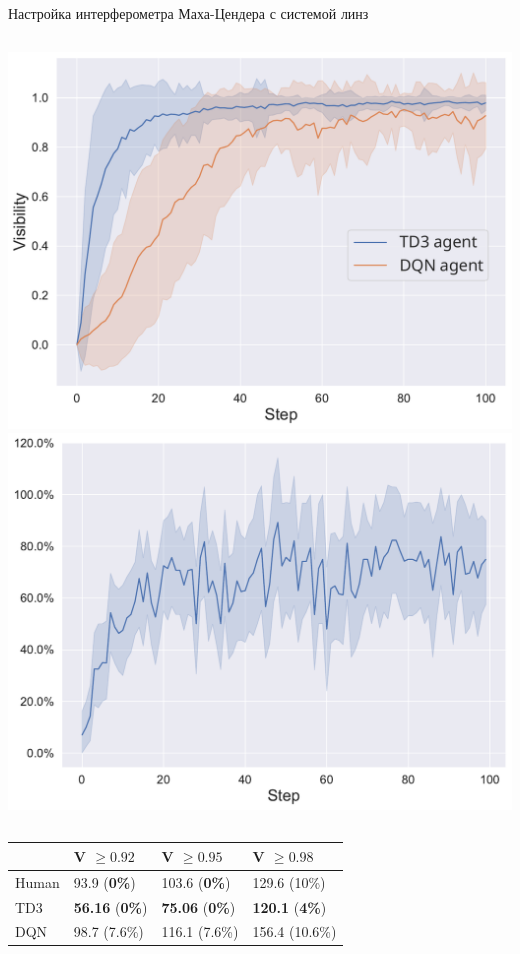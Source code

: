\begin{frame}[allowframebreaks]{Настройка интерферометра Маха-Цендера с системой линз}
\begin{columns}
\centering
\includegraphics[width=1\linewidth]{images/DQN_vs_TD3.pdf}
\centering
\includegraphics[width=1\linewidth]{images/parallel_actions_count_for_each_axis.pdf}
\end{columns}
\begin{table} [htbp]
    \centering
    \begin{threeparttable}
        \begin{tabular}{| p{2cm} || p{2cm} || p{2cm} || p{3cm} |}
            \hline
            \hline
            &V $\ge 0.92$ & V $\ge 0.95$ & V $\ge 0.98$ \\
            \hline
            Human &  93.9 (\textbf{0\%})  & 103.6 (\textbf{0\%}) & 129.6 (10\%)\\
            TD3 &  \textbf{56.16} (\textbf{0\%}) & \textbf{75.06} (\textbf{0\%}) & \textbf{120.1} (\textbf{4\%})\\
            DQN &  98.7 (7.6\%) & 116.1 (7.6\%) & 156.4 (10.6\%)\\
            \hline
            \hline
        \end{tabular}
    \end{threeparttable}
\end{table}


\end{frame}
